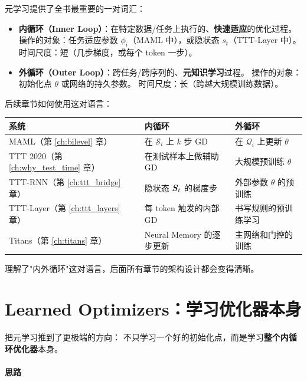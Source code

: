 元学习提供了全书最重要的一对词汇：

\begin{definition}[内循环与外循环]
\begin{itemize}
  \item \textbf{内循环（Inner Loop）}：在特定数据/任务上执行的、\textbf{快速适应}的优化过程。
        操作的对象：任务适应参数 $\phi_i$（MAML 中），或隐状态 $s_t$（TTT-Layer 中）。
        时间尺度：短（几步梯度，或每个 token 一步）。
  \item \textbf{外循环（Outer Loop）}：跨任务/跨序列的、\textbf{元知识学习}过程。
        操作的对象：初始化点 $\theta$ 或网络的持久参数。
        时间尺度：长（跨越大规模训练数据）。
\end{itemize}
\end{definition}

后续章节如何使用这对语言：

\begin{center}
\begin{tabular}{p{3cm}p{4.5cm}p{4.5cm}}
\toprule
系统 & 内循环 & 外循环 \\
\midrule
MAML（第 \ref{ch:bilevel} 章） & 在 $\mathcal{S}_i$ 上 $k$ 步 GD & 在 $\mathcal{Q}_i$ 上更新 $\theta$ \\
TTT 2020（第 \ref{ch:why_test_time} 章） & 在测试样本上做辅助 GD & 大规模预训练 $\theta$ \\
TTT-RNN（第 \ref{ch:ttt_bridge} 章） & 隐状态 $\boldsymbol{S}_t$ 的梯度步 & 外部参数 $\theta$ 的预训练 \\
TTT-Layer（第 \ref{ch:ttt_layers} 章） & 每 token 触发的内部 GD & 书写规则的预训练学习 \\
Titans（第 \ref{ch:titans} 章） & Neural Memory 的逐步更新 & 主网络和门控的训练 \\
\bottomrule
\end{tabular}
\end{center}

理解了"内外循环"这对语言，后面所有章节的架构设计都会变得清晰。

\section{Learned Optimizers：学习优化器本身}
\label{sec:learned_optim}

\citet{andrychowicz2016l2l} 把元学习推到了更极端的方向：
不只学习一个好的初始化点，而是学习\textbf{整个内循环优化器}本身。

\paragraph{思路}

